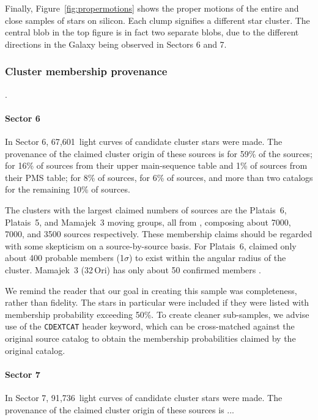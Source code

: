 \documentclass[12pt,twocolumn,tighten]{aastex62}
\newcommand{\sVInumberlcs}{67{,}601\ }  %
\newcommand{\sVIInumberlcs}{91{,}736\ }  %
\begin{document}
Finally, 
Figure~\ref{fig:propermotions} shows the proper motions
of the entire and close samples of stars on silicon.
Each clump signifies a different star cluster. The central
blob in the top figure is in fact two separate blobs,
due to the different directions in the Galaxy being observed
in Sectors 6 and 7.



\subsubsection{Cluster membership provenance}.

\paragraph{Sector 6}
In Sector 6, \sVInumberlcs light curves of candidate cluster stars
were made. The provenance of the claimed cluster origin of these
sources is \citet{dias_proper_2014} for 59\% of the sources;
\citet{zari_3d_2018} for 16\% of sources from their upper
main-sequence table and 1\% of sources from their PMS table;
\citet{Kharchenko_et_al_2013} for 8\% of sources,
\citet{cantat-gaudin_gaia_2018} for 6\% of sources, and more than two
catalogs for the remaining 10\% of sources.

The clusters with the largest claimed numbers of sources are the
Platais~6, Platais~5, and Mamajek~3 moving groups, all from
\citet{dias_proper_2014}, composing about 7000, 7000, and 3500 sources
respectively. These membership claims should be regarded with some
skepticism on a source-by-source basis.  For Platais~6,
\citet{Kharchenko_et_al_2013} claimed only about 400 probable members
(1$\sigma$) to exist within the angular radius of the cluster.
Mamajek~3 (32$\,$Ori) has only about 50 confirmed members
\citep{bell_32ori_2017}.

We remind the reader that our goal in creating this sample was
completeness, rather than fidelity. The \citet{dias_proper_2014} stars
in particular were included if they were listed with membership
probability exceeding 50\%.  To create cleaner sub-samples, we advise
use of the \texttt{CDEXTCAT} header keyword, which can be
cross-matched against the original source catalog to obtain the
membership probabilities claimed by the original catalog.

\paragraph{Sector 7}
In Sector 7, \sVIInumberlcs light curves of candidate cluster stars
were made. The provenance of the claimed cluster origin of these
sources is  ...
\end{document}
